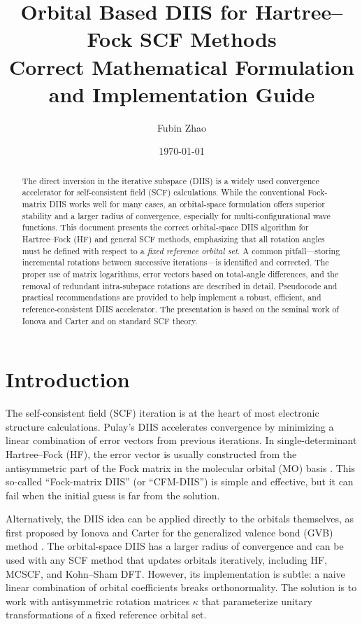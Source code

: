 \documentclass[12pt,a4paper]{article}
\title{Orbital Based DIIS for Hartree--Fock SCF Methods\\
\large{Correct Mathematical Formulation and Implementation Guide}}
\author{Fubin Zhao}
\date{\today}
\begin{document}
\maketitle

\begin{abstract}
The direct inversion in the iterative subspace (DIIS) is a widely used convergence accelerator for self-consistent field (SCF) calculations. While the conventional Fock-matrix DIIS works well for many cases, an orbital-space formulation offers superior stability and a larger radius of convergence, especially for multi-configurational wave functions. This document presents the correct orbital-space DIIS algorithm for Hartree--Fock (HF) and general SCF methods, emphasizing that all rotation angles must be defined with respect to a \emph{fixed reference orbital set}. A common pitfall---storing incremental rotations between successive iterations---is identified and corrected. The proper use of matrix logarithms, error vectors based on total-angle differences, and the removal of redundant intra-subspace rotations are described in detail. Pseudocode and practical recommendations are provided to help implement a robust, efficient, and reference‑consistent DIIS accelerator. The presentation is based on the seminal work of Ionova and Carter \cite{Ionova1995} and on standard SCF theory.
\end{abstract}

\section{Introduction}
The self-consistent field (SCF) iteration is at the heart of most electronic structure calculations. Pulay's DIIS \cite{Pulay1980} accelerates convergence by minimizing a linear combination of error vectors from previous iterations. In single-determinant Hartree--Fock (HF), the error vector is usually constructed from the antisymmetric part of the Fock matrix in the molecular orbital (MO) basis \cite{Pulay1982,Hamilton1986}. This so-called ``Fock-matrix DIIS'' (or ``CFM-DIIS'') is simple and effective, but it can fail when the initial guess is far from the solution.

Alternatively, the DIIS idea can be applied directly to the orbitals themselves, as first proposed by Ionova and Carter for the generalized valence bond (GVB) method \cite{Ionova1995}. The orbital-space DIIS has a larger radius of convergence and can be used with any SCF method that updates orbitals iteratively, including HF, MCSCF, and Kohn--Sham DFT. However, its implementation is subtle: a naive linear combination of orbital coefficients breaks orthonormality. The solution is to work with antisymmetric rotation matrices $\kappa$ that parameterize unitary transformations of a fixed reference orbital set.
\end{document}
